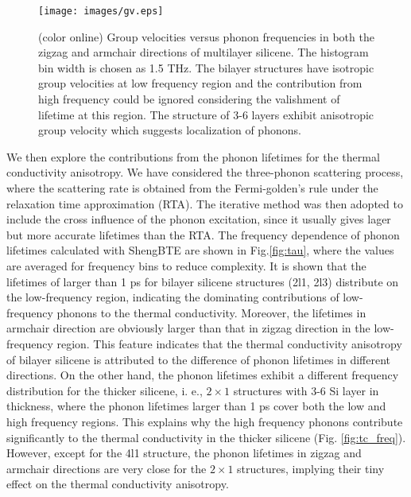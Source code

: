 \documentclass[aps,prb,twocolumn,showpacs,amsmath,amssymb]{revtex4-1}
\begin{document}
\begin{figure}[b]
  \texttt{[image: images/gv.eps]}{}
  \caption{\label{fig:gv} (color online) Group velocities versus phonon frequencies in both the zigzag and armchair directions of multilayer silicene. The histogram bin width is chosen as 1.5 THz. The bilayer structures have isotropic group velocities at low frequency region and the contribution from high frequency could be ignored considering the valishment of lifetime at this region. The structure of 3-6 layers exhibit anisotropic group velocity which suggests localization of phonons.}
\end{figure}
We then explore the contributions from the phonon lifetimes for the thermal conductivity anisotropy.
We have considered the three-phonon scattering process, where the scattering rate is obtained from the Fermi-golden's rule\cite{Li2014} under the relaxation time approximation (RTA). The iterative method was then adopted to include the cross influence of the phonon excitation, since it usually gives lager but more accurate lifetimes than the RTA. The frequency dependence of phonon lifetimes calculated with ShengBTE\cite{Li2014} are shown in Fig.\ref{fig:tau}, where the values are averaged for frequency bins to reduce complexity.  It is shown that the lifetimes of larger than 1 ps for bilayer silicene structures (2l1, 2l3) distribute on the low-frequency region, indicating the dominating contributions of low-frequency phonons to the thermal conductivity. Moreover, the lifetimes in armchair direction are obviously larger than that in zigzag direction in the low-frequency region. This feature indicates that the thermal conductivity anisotropy of bilayer silicene is attributed to the difference of phonon lifetimes in different directions.
On the other hand, the phonon lifetimes exhibit a different frequency distribution for the thicker silicene, i. e.,  $2\times1$ structures with 3-6 Si layer in thickness, where the phonon lifetimes larger than 1 ps cover both the low and high frequency regions.  This explains why the high frequency phonons contribute significantly to the thermal conductivity in the thicker silicene (Fig. \ref{fig:tc_freq}).  However, except for the 4l1 structure, the phonon lifetimes in zigzag and armchair directions are very close for the $2\times1$ structures, implying their tiny effect on the thermal conductivity anisotropy.
\end{document}
